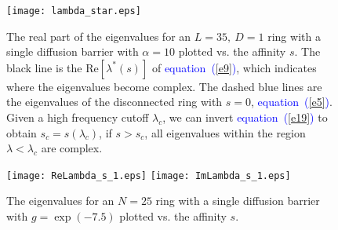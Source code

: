 \documentclass[aps,pre,floats,floatfix,fleqn,notitlepage]{revtex4-1}
\newcommand{\Eq}[1]{\textcolor{blue}{equation~(\ref{#1})}} %
\begin{document}
\begin{figure}[h]
\texttt{[image: lambda\_star.eps]}
\caption{The real part of the eigenvalues for an $L=35, \ D=1$ ring with a single diffusion barrier with $\alpha=10$ plotted vs. the affinity $s$.
The black line is the $\mbox{Re}[\lambda^{*}(s)]$ of \Eq{e9}, which indicates where the eigenvalues become complex. 
The dashed blue lines are the eigenvalues of the disconnected ring with $s=0$, \Eq{e5}.
Given a high frequency cutoff $\lambda_c$, we can invert \Eq{e19} to obtain $s_c = s(\lambda_c)$, if $s>s_c$, all eigenvalues within the region $\lambda<\lambda_c$ are complex.
}
\label{lambda_star}
\end{figure}
\begin{figure}
\texttt{[image: ReLambda\_s\_1.eps]}
\texttt{[image: ImLambda\_s\_1.eps]}
\caption{The eigenvalues for an $N=25$ ring with a single diffusion barrier with $g=\exp(-7.5)$ plotted vs. the affinity $s$.}
\label{discrete}
\end{figure}



%
%

\end{document}
